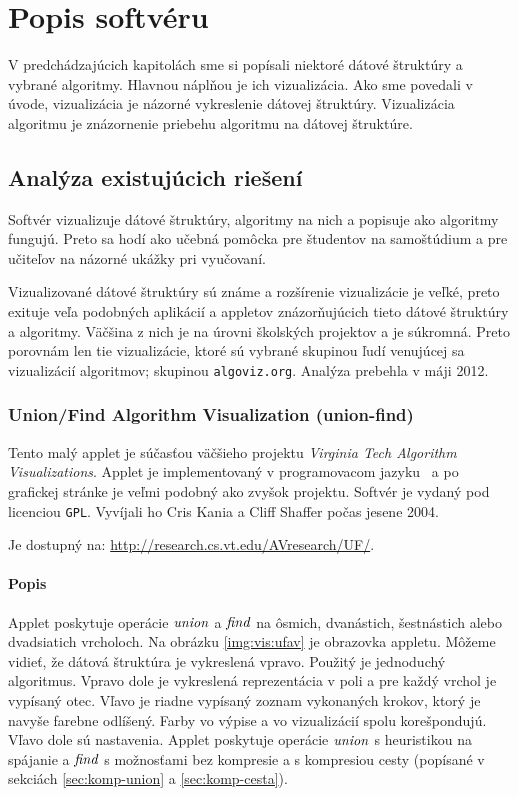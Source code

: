 \chapter{Popis softvéru}\label{chap:popis}

V predchádzajúcich kapitolách sme si popísali niektoré dátové štruktúry a 
vybrané algoritmy. Hlavnou náplňou je ich vizualizácia. Ako sme povedali v 
úvode, vizualizácia je názorné vykreslenie dátovej štruktúry. Vizualizácia 
algoritmu je znázornenie priebehu algoritmu na dátovej štruktúre. 

\section{Analýza existujúcich riešení}

Softvér vizualizuje dátové štruktúry, algoritmy na nich a popisuje ako 
algoritmy fungujú. Preto sa hodí ako učebná pomôcka pre študentov na 
samoštúdium a pre učiteľov na názorné ukážky pri vyučovaní.

Vizualizované dátové štruktúry sú známe a rozšírenie vizualizácie je veľké, 
preto exituje veľa podobných aplikácií a appletov znázorňujúcich tieto 
dátové štruktúry a algoritmy. Väčšina z nich je na úrovni školských projektov 
a je súkromná. Preto porovnám len tie vizualizácie, ktoré sú vybrané skupinou 
ľudí venujúcej sa vizualizácií algoritmov; skupinou {\tt algoviz.org}. 
Analýza prebehla v máji 2012.

\subsection{Union/Find Algorithm Visualization (union-find)}\label{sec:ufav}
Tento malý applet je súčasťou väčšieho projektu \emph{Virginia Tech Algorithm 
Visualizations}. Applet je implementovaný v programovacom jazyku \Java\ a po
grafickej stránke je veľmi podobný ako zvyšok projektu. Softvér je vydaný pod 
licenciou {\tt GPL}. Vyvíjali ho Cris Kania a Cliff Shaffer počas jesene 2004. 

Je dostupný na: \url{http://research.cs.vt.edu/AVresearch/UF/}.

\subsubsection{Popis}
Applet poskytuje operácie $\mathop{\mathit{union}}$ a $\mathop{\mathit{find}}$ na ôsmich, dvanástich, šestnástich 
alebo dvadsiatich vrcholoch. Na obrázku \ref{img:vis:ufav} je obrazovka 
appletu. Môžeme vidieť, že dátová štruktúra je vykreslená vpravo. Použitý je 
jednoduchý algoritmus. Vpravo dole je vykreslená reprezentácia v poli a 
pre každý vrchol je vypísaný otec. Vľavo je riadne vypísaný zoznam vykonaných 
krokov, ktorý je navyše farebne odlíšený. Farby vo výpise a vo vizualizácií 
spolu korešpondujú. Vľavo dole sú nastavenia. 
Applet poskytuje operácie $\mathop{\mathit{union}}$ s heuristikou na spájanie a $\mathop{\mathit{find}}$ s 
možnosťami bez kompresie a s kompresiou cesty 
(popísané v sekciách \ref{sec:komp-union} a \ref{sec:komp-cesta}).

